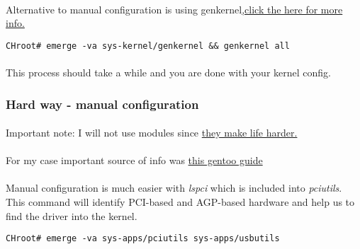 \documentclass[10pt,a4paper]{article}
\begin{document}
                \paragraph{} Alternative to manual configuration is using genkernel\href{https://wiki.gentoo.org/wiki/Handbook:AMD64/Installation/Kernel#Alternative:_Using_genkernel}{,click the here for more info.}
\begin{lstlisting}[style=BashInputCHRoot]
 CHroot# emerge -va sys-kernel/genkernel && genkernel all
\end{lstlisting}
                
                \paragraph{} This process should take a while and you are done with your kernel config.
                
            \newpage
            \subsubsection{Hard way - manual configuration}
                
                \paragraph{} Important note: I will not use modules since \href{https://wiki.gentoo.org/wiki/Kernel/Gentoo_Kernel_Configuration_Guide#Modules_do_not_get_loaded_automatically}{they make life harder.}
                
                \paragraph{} For my case important source of info was \href{https://wiki.gentoo.org/wiki/Lenovo_ThinkPad_T440s}{this gentoo guide}
                
                \paragraph{} Manual configuration is much easier with \textit{lspci} which is included into \textit{pciutils}. This command will identify PCI-based and AGP-based hardware and help us to find the driver into the kernel.
                
\begin{lstlisting}[style=BashInputCHRoot]
 CHroot# emerge -va sys-apps/pciutils sys-apps/usbutils
\end{lstlisting}
                
\end{document}
